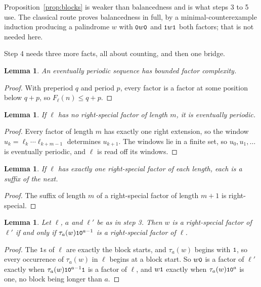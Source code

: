 \documentclass[11pt,a4paper]{article}
\newcommand{\seq}[1]{\texttt{\small #1}}
\theoremstyle{definition}
\theoremstyle{plain}
\newtheorem{lemma}[definition]{Lemma}
\begin{document}
Proposition~\ref{prop:blocks} is weaker than balancedness and is what steps 3
to 5 use. The classical route proves balancedness in full, by a
minimal-counterexample induction producing a palindrome $w$ with
$\seq{0}w\seq{0}$ and $\seq{1}w\seq{1}$ both factors; that is not needed here.

Step 4 needs three more facts, all about counting, and then one bridge.

\begin{lemma}\label{lem:evper}
An eventually periodic sequence has bounded factor complexity.
\end{lemma}

\begin{proof}
With preperiod $q$ and period $p$, every factor is a factor at some position
below $q+p$, so $F_\ell(n) \leq q+p$.
\end{proof}

\begin{lemma}\label{lem:aper}
If $\ell$ has no right-special factor of length $m$, it is eventually periodic.
\end{lemma}

\begin{proof}
Every factor of length $m$ has exactly one right extension, so the window
$u_k = \ell_k\cdots\ell_{k+m-1}$ determines $u_{k+1}$. The windows lie in a
finite set, so $u_0, u_1, \ldots$ is eventually periodic, and $\ell$ is read off
its windows.
\end{proof}

\begin{lemma}\label{lem:rschain}
If $\ell$ has exactly one right-special factor of each length, each is a suffix
of the next.
\end{lemma}

\begin{proof}
The suffix of length $m$ of a right-special factor of length $m+1$ is
right-special.
\end{proof}

\begin{lemma}\label{lem:bridge}
Let $\ell$, $a$ and $\ell'$ be as in step 3. Then $w$ is a right-special factor
of $\ell'$ if and only if $\tau_a(w)\seq{1}\seq{0}^{a-1}$ is a right-special
factor of $\ell$.
\end{lemma}

\begin{proof}
The $\seq{1}$s of $\ell$ are exactly the block starts, and $\tau_a(w)$ begins
with $\seq{1}$, so every occurrence of $\tau_a(w)$ in $\ell$ begins at a block
start. So $w\seq{0}$ is a factor of $\ell'$ exactly when
$\tau_a(w)\seq{1}\seq{0}^{a-1}\seq{1}$ is a factor of $\ell$, and $w\seq{1}$
exactly when $\tau_a(w)\seq{1}\seq{0}^{a}$ is one, no block being longer
than $a$.
\end{proof}
\end{document}
